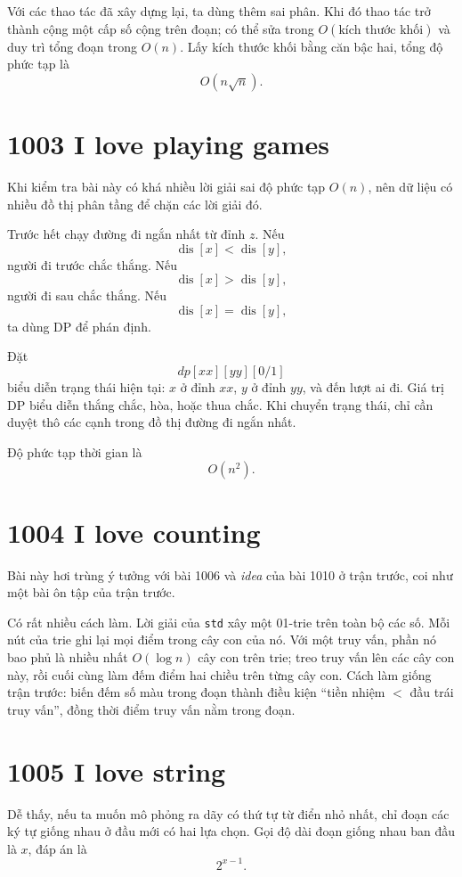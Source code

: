 \documentclass[11pt]{article}
\begin{document}
Với các thao tác đã xây dựng lại, ta dùng thêm sai phân. Khi đó thao tác trở
thành cộng một cấp số cộng trên đoạn; có thể sửa trong $O(\text{kích thước
khối})$ và duy trì tổng đoạn trong $O(n)$. Lấy kích thước khối bằng căn bậc
hai, tổng độ phức tạp là
\[
  O(n\sqrt n).
\]

\section{1003 I love playing games}

Khi kiểm tra bài này có khá nhiều lời giải sai độ phức tạp $O(n)$, nên dữ
liệu có nhiều đồ thị phân tầng để chặn các lời giải đó.

Trước hết chạy đường đi ngắn nhất từ đỉnh $z$. Nếu
\[
  \operatorname{dis}[x] < \operatorname{dis}[y],
\]
người đi trước chắc thắng. Nếu
\[
  \operatorname{dis}[x] > \operatorname{dis}[y],
\]
người đi sau chắc thắng. Nếu
\[
  \operatorname{dis}[x] = \operatorname{dis}[y],
\]
ta dùng DP để phán định.

Đặt
\[
  dp[xx][yy][0/1]
\]
biểu diễn trạng thái hiện tại: $x$ ở đỉnh $xx$, $y$ ở đỉnh $yy$, và đến lượt
ai đi. Giá trị DP biểu diễn thắng chắc, hòa, hoặc thua chắc. Khi chuyển trạng
thái, chỉ cần duyệt thô các cạnh trong đồ thị đường đi ngắn nhất.

Độ phức tạp thời gian là
\[
  O(n^2).
\]

\section{1004 I love counting}

Bài này hơi trùng ý tưởng với bài 1006 và \textit{idea} của bài 1010 ở trận
trước, coi như một bài ôn tập của trận trước.

Có rất nhiều cách làm. Lời giải của \texttt{std} xây một 01-trie trên toàn bộ
các số. Mỗi nút của trie ghi lại mọi điểm trong cây con của nó. Với một truy
vấn, phần nó bao phủ là nhiều nhất $O(\log n)$ cây con trên trie; treo truy
vấn lên các cây con này, rồi cuối cùng làm đếm điểm hai chiều trên từng cây
con. Cách làm giống trận trước: biến đếm số màu trong đoạn thành điều kiện
``tiền nhiệm $<$ đầu trái truy vấn'', đồng thời điểm truy vấn nằm trong đoạn.

\section{1005 I love string}

Dễ thấy, nếu ta muốn mô phỏng ra dãy có thứ tự từ điển nhỏ nhất, chỉ đoạn các
ký tự giống nhau ở đầu mới có hai lựa chọn. Gọi độ dài đoạn giống nhau ban đầu
là $x$, đáp án là
\[
  2^{x-1}.
\]
\end{document}
